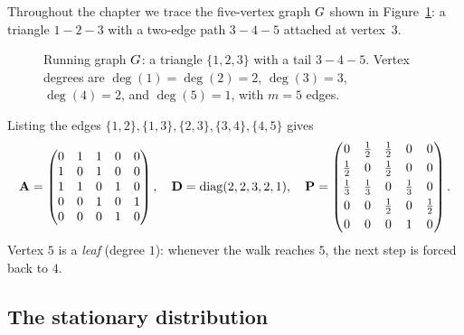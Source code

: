 \begin{example}\label{ch35:ex-running}
Throughout the chapter we trace the five-vertex graph $G$ shown in Figure~\ref{ch35:fig-running}: a triangle $1\!-\!2\!-\!3$ with a two-edge path $3\!-\!4\!-\!5$ attached at vertex~$3$.

\begin{figure}[htbp]
\centering
{}
\caption{Running graph $G$: a triangle $\{1,2,3\}$ with a tail $3\!-\!4\!-\!5$. Vertex degrees are $\deg(1)=\deg(2)=2$, $\deg(3)=3$, $\deg(4)=2$, and $\deg(5)=1$, with $m=5$ edges.}
\label{ch35:fig-running}
\end{figure}

Listing the edges $\{1,2\},\{1,3\},\{2,3\},\{3,4\},\{4,5\}$ gives
\[
  \mathbf{A}=\begin{pmatrix}0&1&1&0&0\\1&0&1&0&0\\1&1&0&1&0\\0&0&1&0&1\\0&0&0&1&0\end{pmatrix},
  \quad
  \mathbf{D}=\operatorname{diag}(2,2,3,2,1),
  \quad
  \mathbf{P}=\begin{pmatrix}
  0&\tfrac12&\tfrac12&0&0\\[3pt]
  \tfrac12&0&\tfrac12&0&0\\[3pt]
  \tfrac13&\tfrac13&0&\tfrac13&0\\[3pt]
  0&0&\tfrac12&0&\tfrac12\\[3pt]
  0&0&0&1&0
  \end{pmatrix}.
\]
Vertex $5$ is a \emph{leaf} (degree $1$): whenever the walk reaches $5$, the next step is forced back to $4$.
\end{example}

\subsection{The stationary distribution}

